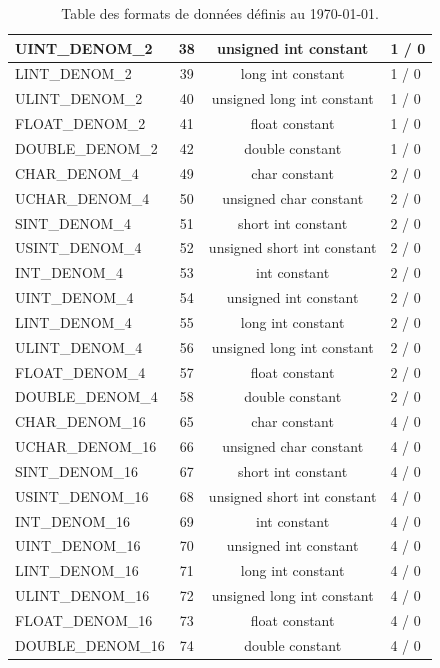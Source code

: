 \documentclass[a4paper,12pt]{article}
\begin{document}
{{{\begin{table}
\begin{tabular}{|l|c|c|l|}
   UINT\_DENOM\_2  &38  & unsigned int constant & 1 / 0\\ \hline
   LINT\_DENOM\_2  &39  & long int constant & 1 / 0 \\ \hline
   ULINT\_DENOM\_2 &40  & unsigned long int constant & 1 / 0 \\ \hline
   FLOAT\_DENOM\_2 &41  & float constant  & 1 / 0 \\ \hline
   DOUBLE\_DENOM\_2&42  & double constant & 1 / 0 \\ \hline
   CHAR\_DENOM\_4  &49  & char constant& 2 / 0\\ \hline
   UCHAR\_DENOM\_4 &50  & unsigned char constant& 2 / 0\\ \hline
   SINT\_DENOM\_4  &51  & short int constant& 2 / 0\\ \hline
   USINT\_DENOM\_4 &52  & unsigned short int constant & 2 / 0\\ \hline
   INT\_DENOM\_4   &53  & int constant & 2 / 0\\ \hline
   UINT\_DENOM\_4  &54  & unsigned int constant & 2 / 0\\ \hline
   LINT\_DENOM\_4  &55  & long int constant & 2 / 0 \\ \hline
   ULINT\_DENOM\_4 &56  & unsigned long int constant & 2 / 0 \\ \hline
   FLOAT\_DENOM\_4 &57  & float constant  & 2 / 0 \\ \hline
   DOUBLE\_DENOM\_4&58  & double constant & 2 / 0 \\ \hline
   CHAR\_DENOM\_16  &65  & char constant& 4 / 0\\ \hline
   UCHAR\_DENOM\_16 &66  & unsigned char constant& 4 / 0\\ \hline
   SINT\_DENOM\_16  &67  & short int constant& 4 / 0\\ \hline
   USINT\_DENOM\_16 &68  & unsigned short int constant & 4 / 0\\ \hline
   INT\_DENOM\_16   &69  & int constant & 4 / 0\\ \hline
   UINT\_DENOM\_16  &70  & unsigned int constant & 4 / 0\\ \hline
   LINT\_DENOM\_16  &71  & long int constant & 4 / 0 \\ \hline
   ULINT\_DENOM\_16 &72  & unsigned long int constant & 4 / 0 \\ \hline
   FLOAT\_DENOM\_16 &73  & float constant  & 4 / 0 \\ \hline
   DOUBLE\_DENOM\_16 &74  & double constant & 4 / 0 \\ \hline
 \end{tabular}
\caption{Table des formats de donn\'ees d\'efinis au \today.}\label{TypesD}
\end{table}

}}}
\end{document}
